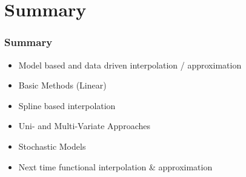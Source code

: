 \documentclass[10pt]{beamer}
\begin{document}
\section{Summary}

\begin{frame}
  \frametitle{Summary}
  \begin{itemize}
  \item Model based and data driven interpolation / approximation
  \item Basic Methods (Linear)
  \item Spline based interpolation
  \item Uni- and Multi-Variate Approaches
  \item Stochastic Models
  \item Next time functional interpolation \& approximation
  \end{itemize}
\end{frame}
\end{document}
